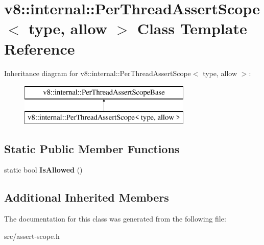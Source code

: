 \hypertarget{classv8_1_1internal_1_1_per_thread_assert_scope}{}\section{v8\+:\+:internal\+:\+:Per\+Thread\+Assert\+Scope$<$ type, allow $>$ Class Template Reference}
\label{classv8_1_1internal_1_1_per_thread_assert_scope}
Inheritance diagram for v8\+:\+:internal\+:\+:Per\+Thread\+Assert\+Scope$<$ type, allow $>$\+:\begin{figure}[H]
\begin{center}
\leavevmode
\includegraphics[height=2.000000cm]{classv8_1_1internal_1_1_per_thread_assert_scope}
\end{center}
\end{figure}
\subsection*{Static Public Member Functions}
\begin{DoxyCompactItemize}
\item 
\hypertarget{classv8_1_1internal_1_1_per_thread_assert_scope_a26628788628a97dc10aaabe0b40a9572}{}static bool {\bfseries Is\+Allowed} ()\label{classv8_1_1internal_1_1_per_thread_assert_scope_a26628788628a97dc10aaabe0b40a9572}

\end{DoxyCompactItemize}
\subsection*{Additional Inherited Members}


The documentation for this class was generated from the following file\+:\begin{DoxyCompactItemize}
\item 
src/assert-\/scope.\+h\end{DoxyCompactItemize}
